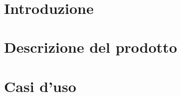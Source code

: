 \documentclass[12pt, a4paper,table]{article}
\title{\textsc{\docNome}}
\author{}
\date{}
\begin{document}


\tableofcontents
\newpage
\section{Introduzione}

\newpage
\section{Descrizione del prodotto}

\newpage
\section{Casi d'uso}

\newpage
\end{document}
